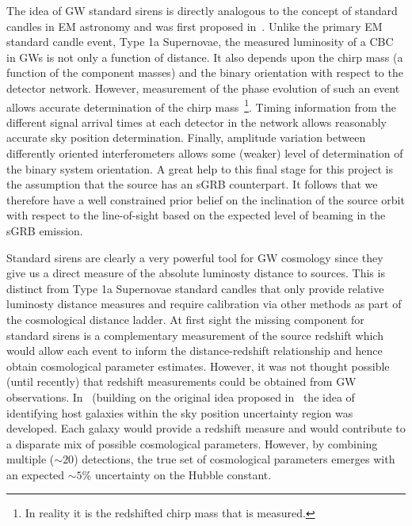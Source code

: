 \documentclass[10pt]{iopart}
\begin{document}
The idea of \ac{GW} standard sirens is directly analogous to the concept of
standard candles in \ac{EM} astronomy and was first proposed
in~\cite{1986Natur.323..310S}. Unlike the primary \ac{EM} standard candle
event, Type 1a Supernovae, the measured luminosity of a \ac{CBC} in \acp{GW} is
not only a function of distance. It also depends upon the chirp mass (a
function of the component masses) and the binary orientation with respect to
the detector network. However, measurement of the phase evolution of such an
event allows accurate determination of the chirp mass~\footnote{In reality it
is the redshifted chirp mass that is measured.}. Timing information from the
different signal arrival times at each detector in the network allows
reasonably accurate sky position determination.  Finally, amplitude variation
between differently oriented interferometers allows some (weaker) level of
determination of the binary system orientation.  A great help to this final
stage for this project is the assumption that the source has an \ac{sGRB}
counterpart.  It follows that we therefore have a well constrained prior belief
on the inclination of the source orbit with respect to the line-of-sight based
on the expected level of beaming in the \ac{sGRB} emission.

Standard sirens are clearly a very powerful tool for \ac{GW} cosmology since
they give us a direct measure of the absolute luminosty distance to sources.
This is distinct from Type 1a Supernovae standard candles that only provide
relative luminosty distance measures and require calibration via other methods
as part of the cosmological distance ladder. At first sight the missing
component for standard sirens is a complementary measurement of the source
redshift which would allow each event to inform the distance-redshift
relationship and hence obtain cosmological parameter estimates.  However, it
was not thought possible (until recently) that redshift measurements could be
obtained from \ac{GW} observations. In~\cite{DelPozzo:2011uf} (building on the
original idea proposed in~\cite{1986Natur.323..310S} the idea of identifying
host galaxies within the sky position uncertainty region was developed. Each
galaxy would provide a redshift measure and would contribute to a disparate mix
of possible cosmological parameters. However, by combining multiple (${\sim}20$)
detections, the true set of cosmological parameters emerges with an expected
${\sim}5\%$ uncertainty on the Hubble constant. 
\end{document}
